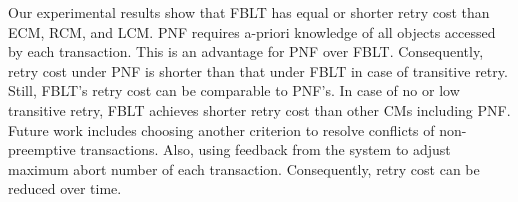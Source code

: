 \documentclass[conference,letterpaper]{IEEEtran}
\begin{document}
Our experimental results show that FBLT has equal or shorter retry cost than ECM, RCM, and LCM. PNF requires a-priori knowledge of all objects accessed by each transaction. This is an advantage for PNF over FBLT. Consequently, retry cost under PNF is shorter than that under FBLT in case of transitive retry. Still, FBLT's retry cost can be comparable to PNF's. In case of no or low transitive retry, FBLT achieves shorter retry cost than other CMs including PNF. 
%
Future work includes choosing another criterion to resolve conflicts of non-preemptive transactions. Also, using feedback from the system to adjust maximum abort number of each transaction. Consequently, retry cost can be reduced over time.




\end{document}
